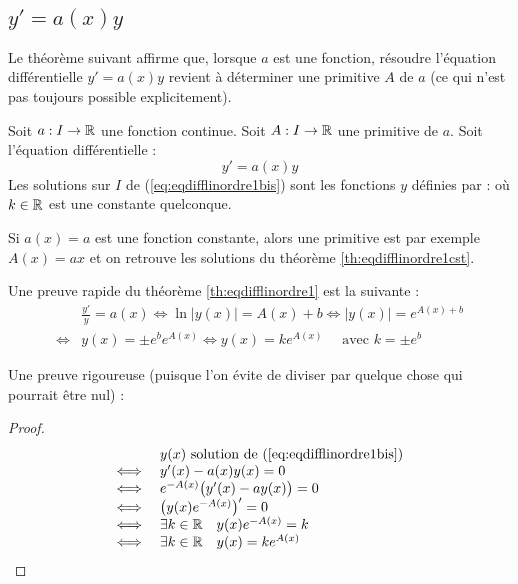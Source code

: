 \documentclass[class=report,crop=false]{standalone}
\begin{document}
\subsection{$y'=a(x)y$}

Le théorème suivant affirme que, lorsque $a$ est une fonction,
résoudre l'équation différentielle $y'=a(x)y$
revient à déterminer une primitive $A$ de $a$ (ce qui n'est pas toujours possible explicitement).



\begin{theoreme}
\label{th:eqdifflinordre1}
Soit $a : I \to \mathbb{R}$ une fonction continue. Soit $A : I \to \mathbb{R}$ une primitive de $a$.
Soit l'équation différentielle :
\begin{equation}
   y' = a(x) y
  \label{eq:eqdifflinordre1bis}
  \tag{$E$}
\end{equation}
Les solutions sur $I$ de (\ref{eq:eqdifflinordre1bis}) sont les fonctions $y$ définies par :
où $k\in \mathbb{R}$ est une constante quelconque.
\end{theoreme}

Si $a(x)=a$ est une fonction constante, alors une primitive est par exemple $A(x)=ax$ et on retrouve
les solutions du théorème \ref{th:eqdifflinordre1cst}.


Une preuve rapide du théorème \ref{th:eqdifflinordre1} est la suivante :
\begin{eqnarray*}
&\frac{y'}{y} =  a(x)
\iff \ln |y(x)| = A(x) + b
\iff |y(x)| = e^{A(x)+b} \\
\iff& y(x) = \pm e^b e^{A(x)}
\iff y(x) = k e^{A(x)} \quad \text{ avec } k = \pm e^b
\end{eqnarray*}


Une preuve rigoureuse (puisque l'on évite de diviser
par quelque chose qui pourrait être nul) :
\begin{proof}
$$\begin{array}{rl}
     & y(x) \text{ solution de (\ref{eq:eqdifflinordre1bis}) } \\
\iff & y'(x) - a(x)y(x) = 0 \\
\iff & e^{-A(x)}\big(y'(x)-ay(x)\big) = 0 \\
\iff & \big( y(x) e^{-A(x)}\big)' = 0 \\
\iff & \exists k \in \mathbb{R} \quad y(x) e^{-A(x)} = k \\
\iff & \exists k \in \mathbb{R} \quad y(x) = ke^{A(x)}\\
\end{array}$$
\end{proof}
\end{document}
